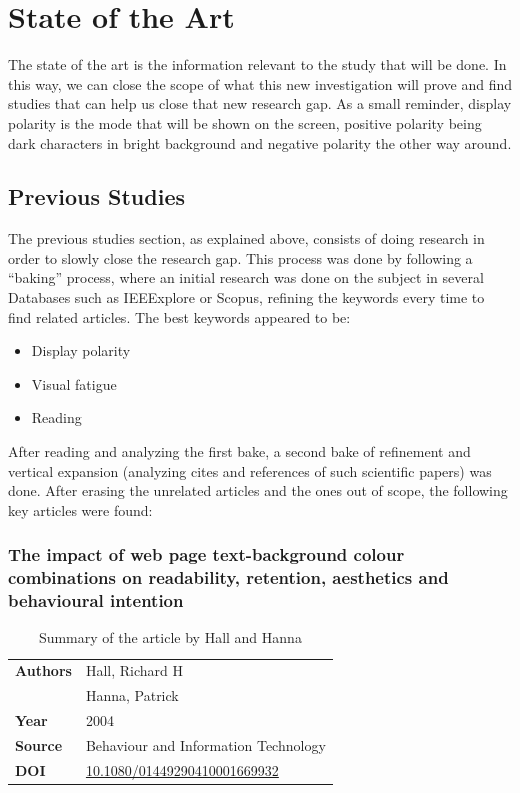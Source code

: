 \chapter{State of the Art}
\label{chap:state_of_the_art}

The state of the art is the information relevant to the study that will be done. In this way, we can close 
the scope of what this new investigation will prove and find studies that can help us close that new research 
gap. As a small reminder, display polarity is the mode that will be shown on the screen, positive polarity 
being dark characters in bright background and negative polarity the other way around.

\section{Previous Studies}
The previous studies section, as explained above, consists of doing research in order to slowly close the 
research gap. This process was done by following a “baking” process, where an initial research was done on 
the subject in several Databases such as IEEExplore\cite{ieee_explore} or Scopus\cite{scopus}, refining the keywords every time to 
find related articles. The best keywords appeared to be:
\begin{itemize}
    \item Display polarity
    \item Visual fatigue
    \item Reading
\end{itemize}
After reading and analyzing the first bake, a second bake of refinement and vertical expansion (analyzing cites and 
references of such scientific papers) was done. After erasing the unrelated articles and the ones out of scope, 
the following key articles were found:


\subsection{The impact of web page text-background colour combinations on readability, retention, aesthetics and behavioural intention\cite{Hall2004}}
\begin{table}[H]   
    \centering
    \caption{Summary of the article by Hall and Hanna}
    \label{tab:hall2004}
    \begin{tabular}{|p{}|p{}|}
        \hline
        \textbf{Authors} & Hall, Richard H \\
                         & Hanna, Patrick \\ \hline
        \textbf{Year}    & 2004 \\ \hline
        \textbf{Source}  & Behaviour and Information Technology \\ \hline
        \textbf{DOI}     & \url{10.1080/01449290410001669932} \\ \hline
    \end{tabular}
\end{table}


